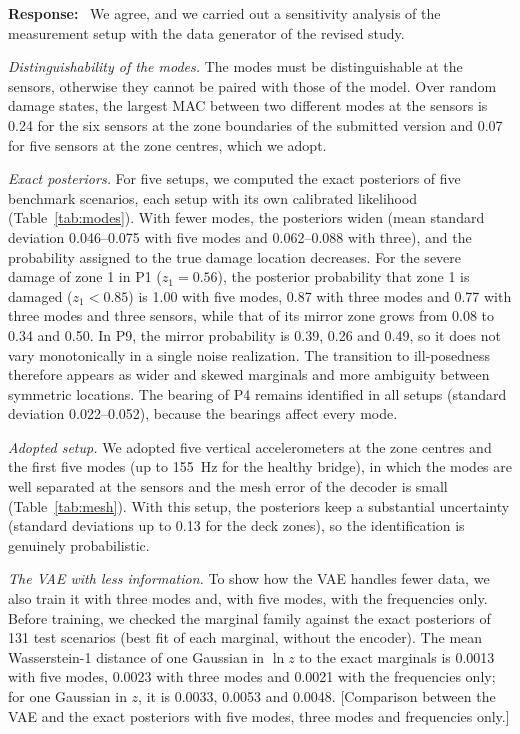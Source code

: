 \documentclass[11pt]{article}
\newenvironment{response}{\par\smallskip\noindent\color{resp}\textbf{Response:}\ }{\par}
\newcommand{\tbd}[1]{\textcolor{note}{\textsf{[#1]}}}
\begin{document}
\begin{response}
We agree, and we carried out a sensitivity analysis of the measurement setup with the data generator of the revised
study.

\textit{Distinguishability of the modes.} The modes must be distinguishable at the sensors, otherwise they cannot be
paired with those of the model. Over random damage states, the largest MAC between two different modes at the sensors is
0.24 for the six sensors at the zone boundaries of the submitted version and 0.07 for five sensors at the
zone centres, which we adopt.

\textit{Exact posteriors.} For five setups, we computed the exact posteriors of five benchmark scenarios, each setup with
its own calibrated likelihood (Table~\ref{tab:modes}). With fewer modes, the posteriors widen (mean standard deviation
0.046--0.075 with five modes and 0.062--0.088 with three), and the probability assigned to the true damage location
decreases. For the severe damage of zone 1 in P1 ($z_1=0.56$), the posterior probability that zone 1 is damaged ($z_1<0.85$) is 1.00 with five modes,
0.87 with three modes and 0.77 with three modes and three sensors, while that of its mirror zone grows from 0.08 to 0.34 and 0.50. In P9, the mirror
probability is 0.39, 0.26 and 0.49, so it does not vary monotonically in a single noise realization. The transition to ill-posedness therefore appears as wider and skewed marginals and more ambiguity between
symmetric locations. The bearing of P4 remains identified in all setups (standard deviation 0.022--0.052), because the bearings affect every mode.

\textit{Adopted setup.} We adopted five vertical accelerometers at the zone centres and the first five modes (up to
155~Hz for the healthy bridge), in which the modes are well separated at the sensors and the mesh error of the decoder is small
(Table~\ref{tab:mesh}). With this setup, the posteriors keep a substantial uncertainty (standard deviations up to 0.13 for the deck zones), so the
identification is genuinely probabilistic.

\textit{The VAE with less information.} To show how the VAE handles fewer data, we also train it with three modes and,
with five modes, with the frequencies only. Before training, we checked the marginal family against the exact posteriors
of 131 test scenarios (best fit of each marginal, without the encoder). The mean Wasserstein-1 distance of one Gaussian in
$\ln z$ to the exact marginals is 0.0013 with five modes, 0.0023 with three modes and 0.0021 with the frequencies only;
for one Gaussian in $z$, it is 0.0033, 0.0053 and 0.0048.
\tbd{Comparison between the VAE and the exact posteriors with five modes, three modes and frequencies only.}
\end{response}
\end{document}

